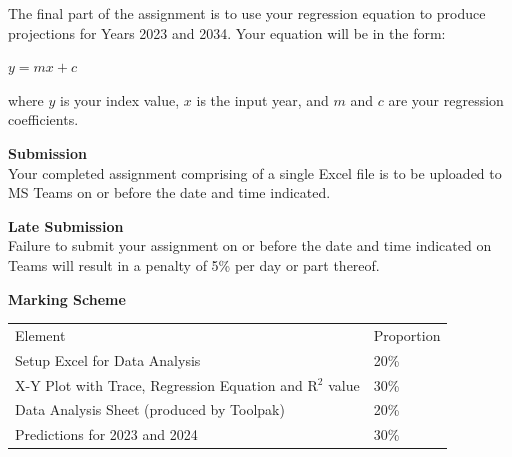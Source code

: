 The final part of the assignment is to use your regression equation to produce projections for Years 2023 and 2034.  Your equation will be in the form:

\begin{center}
	$y = mx +c $
\end{center}

where $y$ is your index value, $x$ is the input year, and $m$ and $c$ are your regression coefficients.



\newpage


\textbf{Submission}\\
Your completed assignment comprising of a single Excel file is to be uploaded to MS Teams on or before the date and time indicated.  

\vspace{0.5cm}

\textbf{Late Submission}\\
Failure to submit your assignment on or before the date and time indicated on Teams will result in a penalty of 5\% per day or part thereof.

\vspace{0.5cm}
\textbf{Marking Scheme}

\begin{table}[h!]
     \begin{center}
     \begin{tabular}{p{9cm}  p{2cm} }
     \toprule
      \textbf\large{Element} & \textbf\large{Proportion} \\ 
    \cmidrule(r){1-1}\cmidrule(lr){2-2}
    	Setup Excel for Data Analysis 		 	& 20\%\\
    	X-Y Plot with Trace, Regression Equation and R$^{2}$ value	& 30\%\\
        Data Analysis Sheet (produced by Toolpak)  	& 20\%\\
        Predictions for 2023 and 2024   	& 30\%\\
      \bottomrule
      \end{tabular}
      \label{tbl:markSchemeAsmt3}
      \end{center}
 \end{table}


